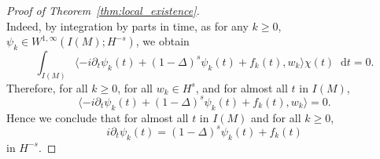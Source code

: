 \documentclass[12pt,a4paper]{amsart}
\numberwithin{equation}{section}
\newcommand*\diff{\mathop{}\!\mathrm{d}}
\begin{document}
\begin{proof}[Proof of Theorem~\ref{thm:local_existence}]
\begin{equation}
		\end{equation}
		Indeed, by integration by parts in time, as for any $k \geq 0$, $ \psi_k \in W^{1,\infty} (I(M);H^{-s})$, we obtain
		\begin{equation*}
			\int_{I(M)} \langle - i \partial_{t} \psi_{k}(t) +  (1-\Delta)^s \psi_{k}(t) + f_{k}(t) , w_k \rangle  \chi(t)  \diff  t= 0 .
		\end{equation*}
		Therefore, for all $k \geq 0$, for all $w_k \in H^s $, and for almost all $t$ in $I(M)$,
		\begin{equation*}
			\langle - i \partial_{t} \psi_{k}(t) +  (1-\Delta)^s \psi_{k}(t) + f_{k}(t) , w_k \rangle = 0.
		\end{equation*}
		Hence we conclude that for almost all $t$ in $I(M)$ and for all $k \geq 0$, 
		\[i \partial_{t} \psi_{k}(t) = (1-\Delta)^s \psi_{k}(t) + f_{k}(t)\]
		in $H^{-s}$. %
		

\end{proof}
\end{document}
